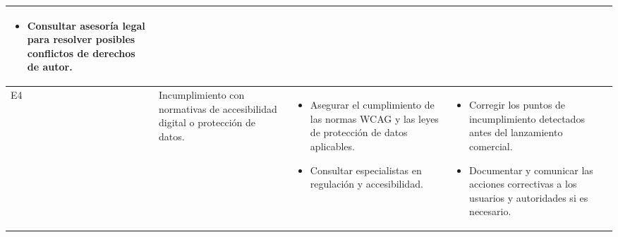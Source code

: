 \begin{longtable}{|>{\centering\arraybackslash}p{0.7cm}|>{\raggedright\arraybackslash}p{4cm}|>{\raggedright\arraybackslash}p{5.5cm}|>{\raggedright\arraybackslash}p{5.5cm}|}
\begin{itemize}
		\item Consultar asesoría legal para resolver posibles conflictos de derechos de autor.
	\end{itemize} \\
	\hline
	E4 & Incumplimiento con normativas de accesibilidad digital o protección de datos. &
	\begin{itemize}
		\item Asegurar el cumplimiento de las normas WCAG y las leyes de protección de datos aplicables.
		\item Consultar especialistas en regulación y accesibilidad.
	\end{itemize} &
	\begin{itemize}
		\item Corregir los puntos de incumplimiento detectados antes del lanzamiento comercial.
		\item Documentar y comunicar las acciones correctivas a los usuarios y autoridades si es necesario.
	\end{itemize} \\
	\hline
\end{longtable}

